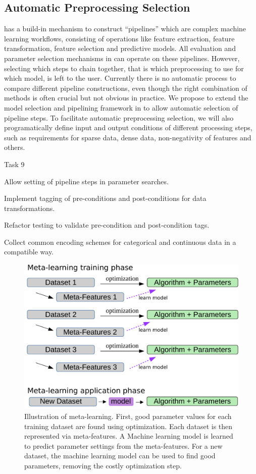 \subsection{Automatic Preprocessing Selection}
\sklearn{} has a build-in mechanism to construct ``pipelines'' which are complex 
machine learning workflows, consisting of operations like feature extraction,
feature transformation, feature selection and predictive models.
All evaluation and parameter selection mechanisms in \sklearn{} can operate
on these pipelines.
However, selecting which steps to chain together, that is which preprocessing
to use for which model, is left to the user. Currently there is no
automatic process to compare different pipeline constructions, even though
the right combination of methods is often crucial but not obvious in practice.
We propose to extend the model selection and pipelining framework in \sklearn{}
to allow automatic selection of pipeline steps.
To facilitate automatic preprocessing selection, we will also programatically
define input and output conditions of different processing steps, such
as requirements for sparse data, dense data, non-negativity of features and others.
\begin{labeling}{Task 9}
    \item [Task 6] Allow setting of pipeline steps in \sklearn{} parameter searches.
    \item [Task 7] Implement tagging of pre-conditions and post-conditions for data transformations.
    \item [Task 8] Refactor \sklearn{} testing to validate pre-condition and post-condition tags.
    \item [Task 9] Collect common encoding schemes for categorical and
        continuous data in a \sklearn{} compatible way.
\end{labeling}

\begin{figure}
    \begin{center}
    \includegraphics[width=.6\linewidth]{meta-learning-diagram.pdf}
    \end{center}
    \caption{Illustration of meta-learning. First, good parameter values for
        each training dataset are found using optimization. Each dataset is
        then represented via meta-features. A Machine learning model is learned
        to predict parameter settings from the meta-features. For a new
        dataset, the machine learning model can be used to find good
    parameters, removing the costly optimization step.}
    \label{meta-learning}
\end{figure}

